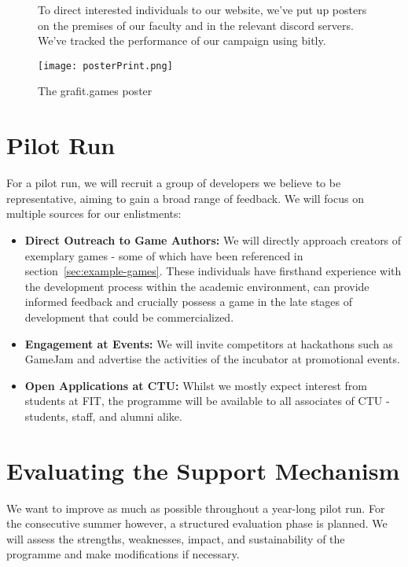 \begin{figure}[H]
    To direct interested individuals to our website, we’ve put up posters on the premises of our faculty and in the relevant discord servers. We’ve tracked the performance of our campaign using bitly.
    
    \vspace{1em}
    \texttt{[image: posterPrint.png]}
    \caption{The grafit.games poster}
    \label{fig:poster}
\end{figure}

\section{Pilot Run}
For a pilot run, we will recruit a group of developers we believe to be representative, aiming to gain a broad range of feedback. We will focus on multiple sources for our enlistments:
\begin{itemize}
    \item \textbf{Direct Outreach to Game Authors:} We will directly approach creators of exemplary games - some of which have been referenced in section~\ref{sec:example-games}. These individuals have firsthand experience with the development process within the academic environment, can provide informed feedback and crucially possess a game in the late stages of development that could be commercialized.
    \item \textbf{Engagement at Events:} We will invite competitors at hackathons such as GameJam and advertise the activities of the incubator at promotional events.
    \item \textbf{Open Applications at CTU:} Whilst we mostly expect interest from students at FIT, the programme will be available to all associates of CTU - students, staff, and alumni alike.
\end{itemize}

\section{Evaluating the Support Mechanism}
We want to improve as much as possible throughout a year-long pilot run. For the consecutive summer however, a structured evaluation phase is planned. We will assess the strengths, weaknesses, impact, and sustainability of the programme and make modifications if necessary.


